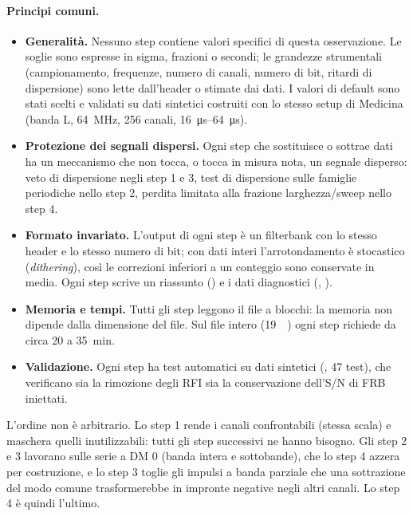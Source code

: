 \paragraph{Principi comuni.}
\begin{itemize}
  \item \textbf{Generalità.} Nessuno step contiene valori specifici di questa osservazione. Le soglie sono espresse in
    sigma, frazioni o secondi; le grandezze strumentali (campionamento, frequenze, numero di canali, numero di bit,
    ritardi di dispersione) sono lette dall'header o stimate dai dati. I valori di default sono stati scelti e
    validati su dati sintetici costruiti con lo stesso setup di Medicina (banda L, \SI{64}{\mega\hertz}, 256 canali,
    \SIrange{16}{64}{\micro\second}).
  \item \textbf{Protezione dei segnali dispersi.} Ogni step che sostituisce o sottrae dati ha un meccanismo che non
    tocca, o tocca in misura nota, un segnale disperso: veto di dispersione negli step 1 e 3, test di dispersione sulle
    famiglie periodiche nello step 2, perdita limitata alla frazione larghezza/sweep nello step 4.
  \item \textbf{Formato invariato.} L'output di ogni step è un filterbank con lo stesso header e lo stesso numero di
    bit; con dati interi l'arrotondamento è stocastico (\emph{dithering}), così le correzioni inferiori a un
    conteggio sono conservate in media. Ogni step scrive un riassunto () e i dati diagnostici
    (, ).
  \item \textbf{Memoria e tempi.} Tutti gli step leggono il file a blocchi: la memoria non dipende dalla dimensione
    del file. Sul file intero (\SI{19}{\giga\byte}) ogni step richiede da circa \SI{20}{} a \SI{35}{\minute}.
  \item \textbf{Validazione.} Ogni step ha test automatici su dati sintetici (, 47 test), che verificano sia
    la rimozione degli RFI sia la conservazione dell'S/N di FRB iniettati.
\end{itemize}

L'ordine non è arbitrario. Lo step 1 rende i canali confrontabili (stessa scala) e maschera quelli inutilizzabili:
tutti gli step successivi ne hanno bisogno. Gli step 2 e 3 lavorano sulle serie a DM 0 (banda intera e sottobande),
che lo step 4 azzera per costruzione, e lo step 3 toglie gli impulsi a banda parziale che una sottrazione del modo
comune trasformerebbe in impronte negative negli altri canali. Lo step 4 è quindi l'ultimo.

